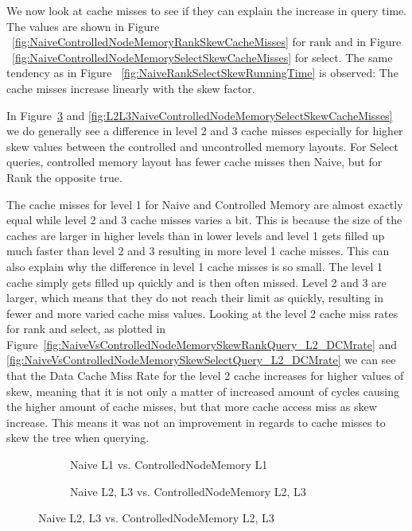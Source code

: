 We now look at cache misses to see if they can explain the increase in query time. 
The values are shown in Figure ~\ref{fig:NaiveControlledNodeMemoryRankSkewCacheMisses} for rank and in Figure ~\ref{fig:NaiveControlledNodeMemorySelectSkewCacheMisses} for select.
The same tendency as in Figure ~\ref{fig:NaiveRankSelectSkewRunningTime} is observed: 
The cache misses increase linearly with the skew factor.

In Figure~\ref{fig:L2L3NaiveControlledNodeMemoryRankSkewCacheMisses} and \ref{fig:L2L3NaiveControlledNodeMemorySelectSkewCacheMisses} we do generally see a difference in level 2 and 3 cache misses especially for higher skew values between the controlled and uncontrolled memory layouts. For Select queries, controlled memory layout has fewer cache misses then Naive, but for Rank the opposite true.

The cache misses for level 1 for Naive and Controlled Memory are almost exactly equal while level 2 and 3 cache misses varies a bit.
This is because the size of the caches are larger in higher levels than in lower levels and level 1 gets filled up much faster than level 2 and 3 resulting in more level 1 cache misses.
This can also explain why the difference in level 1 cache misses is so small. 
The level 1 cache simply gets filled up quickly and is then often missed. Level 2 and 3 are larger, which means that they do not reach their limit as quickly, resulting in fewer and more varied cache miss values.
Looking at the level 2 cache miss rates for rank and select, as plotted in Figure~\ref{fig:NaiveVsControlledNodeMemorySkewRankQuery_L2_DCMrate} and \ref{fig:NaiveVsControlledNodeMemorySkewSelectQuery_L2_DCMrate} we can see that the Data Cache Miss Rate for the level 2 cache increases for higher values of skew, meaning that it is not only a matter of increased amount of cycles causing the higher amount of cache misses, but that more cache access miss as skew increase.
This means it was not an improvement in regards to cache misses to skew the tree when querying.

\begin{figure}
\caption{Rank Cache Misses on Wavelet Tree with increasing skew}
\label{fig:NaiveControlledNodeMemoryRankSkewCacheMisses}
\centering
\begin{subfigure}{\textwidth}
	\caption{Naive L1 vs. ControlledNodeMemory L1}
	\label{fig:L1NaiveControlledNodeMemoryRankSkewCacheMisses}
	
	\vspace*{5 mm}
\end{subfigure}
\begin{subfigure}{\textwidth}
	\caption{Naive L2, L3 vs. ControlledNodeMemory L2, L3}
	\label{fig:L2L3NaiveControlledNodeMemoryRankSkewCacheMisses}
 	
\end{subfigure}
\end{figure}

